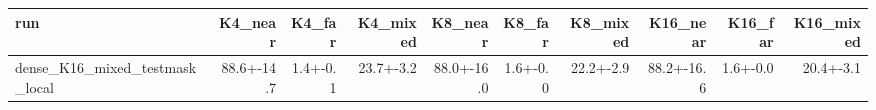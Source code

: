 \begin{tabular}{lrrrrrrrrr}
\toprule
run & K4\_near & K4\_far & K4\_mixed & K8\_near & K8\_far & K8\_mixed & K16\_near & K16\_far & K16\_mixed \\
\midrule
dense\_K16\_mixed\_testmask\_local & 88.6+-14.7 & 1.4+-0.1 & 23.7+-3.2 & 88.0+-16.0 & 1.6+-0.0 & 22.2+-2.9 & 88.2+-16.6 & 1.6+-0.0 & 20.4+-3.1 \\
\bottomrule
\end{tabular}
